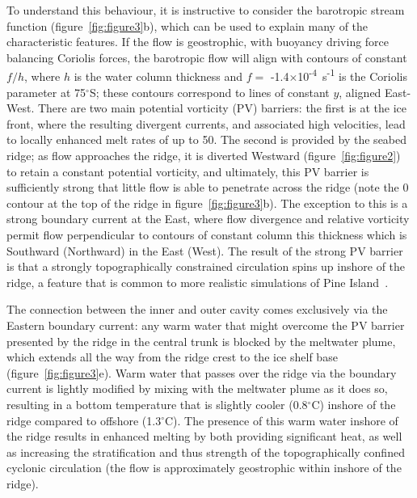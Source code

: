 \documentclass[draft]{agujournal2019}
\begin{document}
To understand this behaviour, it is instructive to consider the barotropic stream function (figure~\ref{fig:figure3}b), which can be used to explain many of the characteristic features. If the flow is geostrophic, with buoyancy driving force balancing Coriolis forces, the barotropic flow will align with contours of constant $f/h$, where $h$ is the water column thickness and $f =$ -1.4$\times$10\textsuperscript{-4}~s\textsuperscript{-1} is the Coriolis parameter at 75${}^\circ$S; these contours correspond to lines of constant $y$, aligned East-West. There are two main potential vorticity (PV) barriers: the first is at the ice front, where the resulting divergent currents, and associated high velocities, lead to locally enhanced melt rates of up to 50\mpryr. The second is provided by the seabed ridge; as flow approaches the ridge, it is diverted Westward (figure~\ref{fig:figure2}) to retain a constant potential vorticity, and ultimately, this PV barrier is sufficiently strong that little flow is able to penetrate across the ridge (note the 0 contour at the top of the ridge in figure~\ref{fig:figure3}b). The exception to this is a strong boundary current at the East, where flow divergence and relative vorticity permit flow perpendicular to contours of constant column this thickness which is Southward (Northward) in the East (West). The result of the strong PV barrier is that a strongly topographically constrained circulation spins up inshore of the ridge, a feature that is common to more realistic simulations of Pine Island~\cite{Heimbach2012AnnGlac, Dutrieux2014Science}.

The connection between the inner and outer cavity comes exclusively via the Eastern boundary current: any warm water that might overcome the PV barrier presented by the ridge in the central trunk is blocked by the meltwater plume, which extends all the way from the ridge crest to the ice shelf base (figure~\ref{fig:figure3}e). Warm water that passes over the ridge via the boundary current is lightly modified by mixing with the meltwater plume as it does so, resulting in a bottom temperature that is slightly cooler (0.8${}^\circ$C) inshore of the ridge compared to offshore (1.3${}^\circ$C). The presence of this warm water inshore of the ridge results in enhanced melting by both providing significant heat, as well as increasing the stratification and thus strength of the topographically confined cyclonic circulation (the flow is approximately geostrophic within inshore of the ridge).
\end{document}
